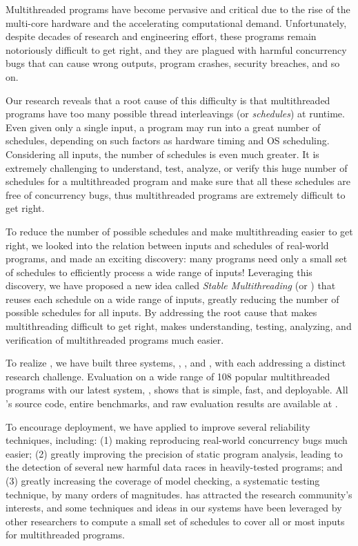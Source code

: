 Multithreaded programs have become pervasive and critical due to the rise of the
multi-core hardware and the accelerating computational demand.
Unfortunately, despite decades of research and engineering effort, these
programs remain notoriously difficult to get right, and they are plagued with
harmful concurrency bugs that can cause wrong outputs, program crashes, security
breaches, and so on.

Our research reveals that a root cause of this difficulty is
that multithreaded programs have too many possible thread interleavings (or
\emph{schedules}) at runtime. Even given only a single input, a program may run 
into a great number of schedules, depending on such factors as hardware timing 
and OS scheduling. Considering all inputs, the number of schedules is even much 
greater. It is extremely challenging to understand, test, analyze, or verify 
this huge number of schedules for a multithreaded program and make sure that 
all these schedules are free of concurrency bugs, thus multithreaded programs 
are extremely difficult to get right.

To reduce the number of possible schedules and make multithreading
easier to get right, we looked into the relation between inputs and schedules 
of real-world programs, and made an exciting discovery: many programs need only 
a small set of schedules to efficiently process a wide range of inputs! 
Leveraging this discovery, we have proposed a new idea called \emph{Stable 
Multithreading} (or \emph{\smt}) that reuses each schedule on a wide range of 
inputs, greatly reducing the number of possible schedules for all inputs. By 
addressing the root cause that makes multithreading difficult to get right, 
\smt makes understanding, testing, analyzing, and verification of 
multithreaded programs much easier.

To realize \smt, we have built three \smt systems, \tern, \peregrine, and 
\parrot, with each addressing a distinct research challenge. Evaluation on a 
wide range of 108 popular multithreaded programs with our latest \smt system, 
\parrot, shows that \smt is simple, fast, and deployable. All \parrot's source 
code, entire benchmarks, and raw evaluation results are available at \github.

To encourage deployment, we have applied \smt to improve several reliability 
techniques, including: (1) making reproducing real-world concurrency bugs much 
easier;  (2) greatly improving the precision of static program analysis, 
leading to the detection of several new harmful data races in heavily-tested 
programs; and (3) greatly increasing the coverage of model checking, a 
systematic testing technique, by many orders of magnitudes. \smt has attracted 
the research community's interests, and some techniques and ideas in our \smt 
systems have been leveraged by other researchers to compute a small set of 
schedules to cover all or most inputs for multithreaded programs.

% 
